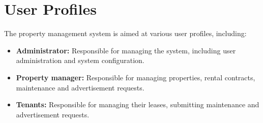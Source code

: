\section{User Profiles}
The property management system is aimed at various user profiles, including:
\begin{itemize}
\item 	\textbf{Administrator:} Responsible for managing the system, including user administration and system configuration.
\item 	\textbf{Property manager:} Responsible for managing properties, rental contracts, maintenance and advertisement requests.
\item 	\textbf{Tenants:} Responsible for managing their leases, submitting maintenance and advertisement requests.
\end{itemize}